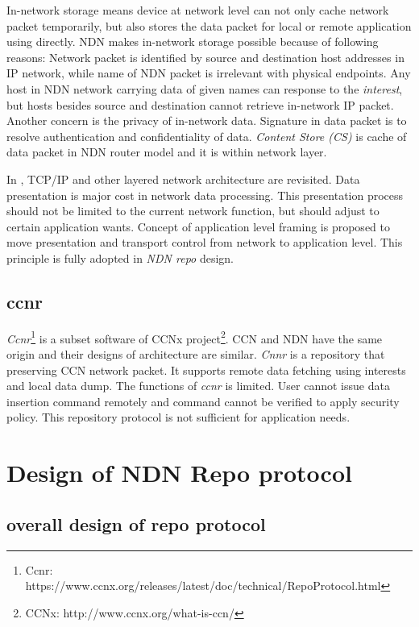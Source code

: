\documentclass[conference]{IEEEtran}
\begin{document}
In-network storage means device at network level can not only cache network packet temporarily, but also stores the data packet for local or remote application using directly. NDN makes in-network storage possible because of following reasons: Network packet is identified by source and destination host addresses in IP network, while name of NDN packet is irrelevant with physical endpoints. Any host in NDN network carrying data of given names can response to the \emph{interest}, but hosts besides source and destination cannot retrieve in-network IP packet. Another concern is the privacy of in-network data. Signature in data packet is to resolve authentication and confidentiality of data. \emph{Content Store (CS)} is cache of data packet in NDN router model and it is within network layer.

In \cite{clark1990architectural}, TCP/IP and other layered network architecture are revisited. Data presentation is major cost in network data processing. This presentation process should not be limited to the current network function, but should adjust to certain application wants. Concept of application level framing is proposed to move presentation and transport control from network to application level. This principle is fully adopted in \emph{NDN repo} design.

\subsection{ccnr}

\emph{Ccnr}\footnote{Ccnr: https://www.ccnx.org/releases/latest/doc/technical/RepoProtocol.html} is a subset software of CCNx project\footnote{CCNx: http://www.ccnx.org/what-is-ccn/}. CCN and NDN have the same origin and their designs of architecture are similar. \emph{Cnnr} is a repository that preserving CCN network packet. It supports remote data fetching using interests and local data dump. The functions of \emph{ccnr} is limited. User cannot issue data insertion command remotely and command cannot be verified to apply security policy. This repository protocol is not sufficient for application needs.

\section{Design of NDN Repo protocol} \label{section-design}

\subsection{overall design of repo protocol}
\end{document}
